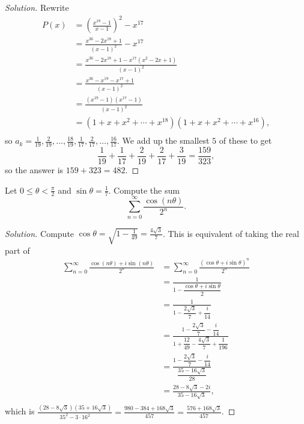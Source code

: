 \ifsolutions
\begin{proof}[Solution]
Rewrite
\[ \begin{aligned}
P(x) &= \left( \frac{x^{18} - 1}{x - 1} \right)^2 - x^{17} \\
&= \frac{x^{36} - 2x^{18} + 1}{(x - 1)^2} - x^{17} \\
&= \frac{x^{36} - 2x^{18} + 1 - x^{17}(x^2 - 2x + 1)}{(x - 1)^2} \\
&= \frac{x^{36} - x^{19} - x^{17} + 1}{(x - 1)^2} \\
&= \frac{(x^{19} - 1) (x^{17} - 1)}{(x - 1)^2} \\
&= (1 + x + x^2 + \cdots + x^{18}) (1 + x + x^2 + \cdots + x^{16}), \\
\end{aligned} \]
so $a_k = \frac{1}{19}, \frac{2}{19}, \dots, \frac{18}{19}, \frac{1}{17},
\frac{2}{17}, \dots, \frac{16}{17}$. We add up the smallest $5$ of these to get
\[ \frac{1}{19} + \frac{1}{17} + \frac{2}{19} + \frac{2}{17} + \frac{3}{19} =
\frac{159}{323}, \]
so the answer is $159 + 323 = \boxed{482}$.
\end{proof}
\fi

\begin{prb}
Let $0 \leq \theta < \frac{\pi}{2}$ and $\sin \theta = \frac{1}{7}$. Compute the
sum
\[ \sum_{n = 0}^{\infty} \frac{\cos (n\theta)}{2^n}. \]
\end{prb}

\ifsolutions
\begin{proof}[Solution]
Compute $\cos \theta = \sqrt{1 - \frac{1}{49}} = \frac{4 \sqrt{3}}{7}$. This is
equivalent of taking the real part of
\[ \begin{aligned}
\sum_{n = 0}^{\infty} \frac{\cos (n\theta) + i \sin (n\theta)}{2^n} &= \sum_{n =
0}^{\infty} \frac{(\cos \theta + i \sin \theta)^n}{2^n} \\
&= \frac{1}{1 - \dfrac{\cos \theta + i \sin \theta}{2}} \\
&= \frac{1}{1 - \dfrac{2 \sqrt{3}}{7} + \dfrac{i}{14}} \\
&= \frac{1 - \dfrac{2 \sqrt{3}}{7} - \dfrac{i}{14}}{1 + \dfrac{12}{49} -
\dfrac{4 \sqrt{3}}{7} + \dfrac{1}{196}} \\
&= \frac{1 - \dfrac{2 \sqrt{3}}{7} - \dfrac{i}{14}}{\dfrac{35 - 16
\sqrt{3}}{28}} \\
&= \frac{28 - 8 \sqrt{3} - 2i}{35 - 16 \sqrt{3}}, \\
\end{aligned} \]
which is $\frac{(28 - 8 \sqrt{3})(35 + 16 \sqrt{3})}{35^2 - 3 \cdot 16^2} =
\frac{980 - 384 + 168 \sqrt{3}}{457} = \boxed{\frac{576 + 168 \sqrt{3}}{457}}$.
\end{proof}
\fi

